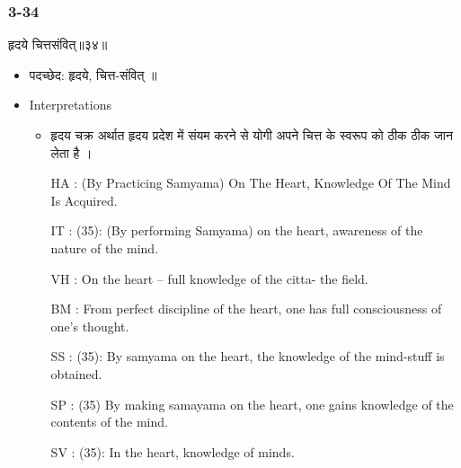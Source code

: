 \begin{frame}[fragile]\frametitle{3-34}
\begin{sanskrit}
हृदये चित्तसंवित्॥३४॥
\end{sanskrit}

	\begin{itemize}
	\item पदच्छेद:  हृदये, चित्त-संवित् ॥
	\item Interpretations
		\begin{itemize}	
		\item हृदय चक्र अर्थात हृदय प्रदेश में संयम करने से योगी अपने चित्त के स्वरूप को ठीक ठीक जान लेता है ।
		\item [HA]: (By Practicing Samyama) On The Heart, Knowledge Of The Mind Is Acquired.
		\item [IT]: (35): (By performing Samyama) on the heart, awareness of the nature of the mind.
		\item [VH]: On the heart – full knowledge of the citta- the field.
		\item [BM]: From perfect discipline of the heart, one has full consciousness of one’s thought.
		\item [SS]: (35): By samyama on the heart, the knowledge of the mind-stuff is obtained.
		\item [SP]: (35) By making samayama on the heart, one gains knowledge of the contents of the mind.
		\item [SV]: (35): In the heart, knowledge of minds. 
		\end{itemize}
	\end{itemize}
\end{frame}


